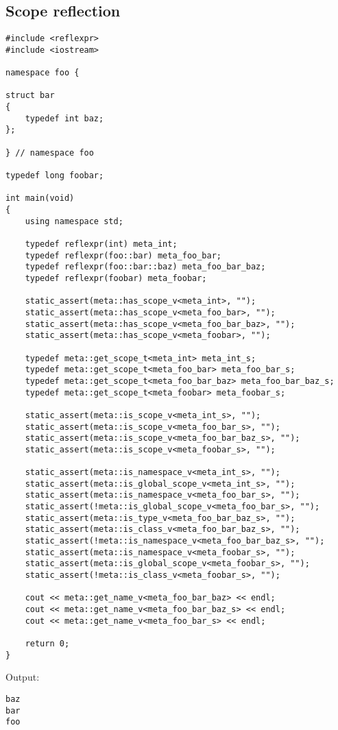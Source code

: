 \subsection{Scope reflection}

\begin{verbatim}
#include <reflexpr>
#include <iostream>

namespace foo {

struct bar
{
	typedef int baz;
};

} // namespace foo

typedef long foobar;

int main(void)
{
	using namespace std;

	typedef reflexpr(int) meta_int;
	typedef reflexpr(foo::bar) meta_foo_bar;
	typedef reflexpr(foo::bar::baz) meta_foo_bar_baz;
	typedef reflexpr(foobar) meta_foobar;

	static_assert(meta::has_scope_v<meta_int>, "");
	static_assert(meta::has_scope_v<meta_foo_bar>, "");
	static_assert(meta::has_scope_v<meta_foo_bar_baz>, "");
	static_assert(meta::has_scope_v<meta_foobar>, "");

	typedef meta::get_scope_t<meta_int> meta_int_s;
	typedef meta::get_scope_t<meta_foo_bar> meta_foo_bar_s;
	typedef meta::get_scope_t<meta_foo_bar_baz> meta_foo_bar_baz_s;
	typedef meta::get_scope_t<meta_foobar> meta_foobar_s;

	static_assert(meta::is_scope_v<meta_int_s>, "");
	static_assert(meta::is_scope_v<meta_foo_bar_s>, "");
	static_assert(meta::is_scope_v<meta_foo_bar_baz_s>, "");
	static_assert(meta::is_scope_v<meta_foobar_s>, "");

	static_assert(meta::is_namespace_v<meta_int_s>, "");
	static_assert(meta::is_global_scope_v<meta_int_s>, "");
	static_assert(meta::is_namespace_v<meta_foo_bar_s>, "");
	static_assert(!meta::is_global_scope_v<meta_foo_bar_s>, "");
	static_assert(meta::is_type_v<meta_foo_bar_baz_s>, "");
	static_assert(meta::is_class_v<meta_foo_bar_baz_s>, "");
	static_assert(!meta::is_namespace_v<meta_foo_bar_baz_s>, "");
	static_assert(meta::is_namespace_v<meta_foobar_s>, "");
	static_assert(meta::is_global_scope_v<meta_foobar_s>, "");
	static_assert(!meta::is_class_v<meta_foobar_s>, "");

	cout << meta::get_name_v<meta_foo_bar_baz> << endl;
	cout << meta::get_name_v<meta_foo_bar_baz_s> << endl;
	cout << meta::get_name_v<meta_foo_bar_s> << endl;

	return 0;
}
\end{verbatim}

Output:

\begin{verbatim}
baz
bar
foo
\end{verbatim}

